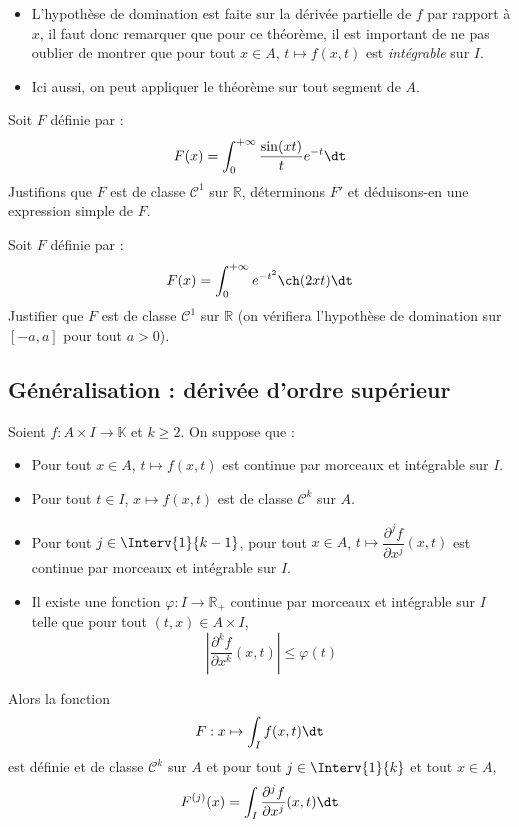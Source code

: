 \documentclass[a4paper,10pt]{report}
\begin{document}
\begin{Remarques}{}
\begin{itemize}
\item L'hypothèse de domination est faite sur la dérivée partielle de $f$ par rapport à $x$, il faut donc remarquer que pour ce théorème, il est important de ne pas oublier de montrer que pour tout $x \in A$, $t \mapsto f(x,t)$ est \emph{intégrable} sur $I$. 
\item Ici aussi, on peut appliquer le théorème sur tout segment de $A$.
\end{itemize}
\end{Remarques}{}

\begin{Exemple} Soit $F$ définie par :
$$ F(x) = \int_{0}^{+ \infty} \frac{\sin(xt)}{t} e^{-t} \dt$$
Justifions que $F$ est de classe $\mathcal{C}^1$ sur $\mathbb{R}$, déterminons $F'$ et déduisons-en une expression simple de $F$.

\vspace{10cm}
\end{Exemple}

\newpage

\begin{ApplicationDirecte} Soit $F$ définie par :
$$ F(x) = \int_{0}^{+ \infty} e^{-t^2} \ch(2xt) \dt$$
Justifier que $F$ est de classe $\mathcal{C}^1$ sur $\mathbb{R}$ (on vérifiera l'hypothèse de domination sur $[-a,a]$ pour tout $a>0$).
\end{ApplicationDirecte}

\subsection{Généralisation : dérivée d'ordre supérieur}
\begin{Theoreme}{}
Soient $f : A \times I \rightarrow \mathbb{K}$ et $k \geq 2$. On suppose que :
\begin{itemize}
\item Pour tout $x \in A$, $t \mapsto f(x,t)$ est continue par morceaux et intégrable sur $I$.
\item Pour tout $t \in I$, $x \mapsto f(x,t)$ est de classe $\mathcal{C}^k$ sur $A$.
\item Pour tout $j \in \Interv{1}{k-1}$, pour tout $x \in A$, $t \mapsto \dfrac{\partial^j f}{\partial x^j}(x,t)$ est continue par morceaux et intégrable sur $I$.
\item Il existe une fonction $\varphi : I \rightarrow \mathbb{R}_+$ continue par morceaux et intégrable sur $I$ telle que pour tout $(t,x) \in A \times I$,
$$ \left\vert \dfrac{\partial^k f}{\partial x^k}(x,t) \right\vert \leq \varphi(t)$$
\end{itemize}
Alors la fonction 
$$ F : x \mapsto \int_{I} f(x,t) \dt$$
est définie et de classe $\mathcal{C}^k$ sur $A$ et pour tout $j \in \Interv{1}{k}$ et tout $x \in A$,
$$ F^{(j)}(x) = \int_{I}  \dfrac{\partial^{j} f}{\partial x^j}(x,t) \dt$$
\end{Theoreme}
\end{document}
